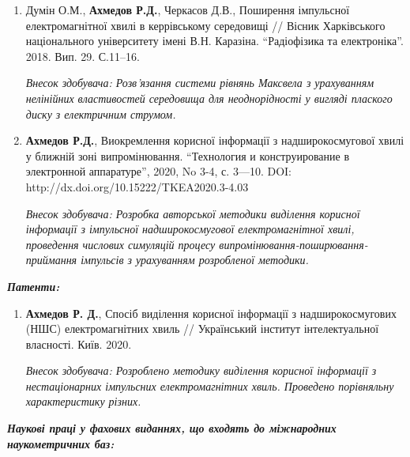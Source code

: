 {\begin{enumerate}
		\item Думін О.М., \textbf{Ахмедов Р.Д.}, Черкасов Д.В., Поширення імпульсної 
		електромагнітної хвилі в керрівському середовищі // Вісник Харківського 
		національного університету імені В.Н. Каразіна. ``Радіофізика та 
		електроніка''. 2018. Вип. 29. С.11--16.
		
		\textit{Внесок здобувача: Розв'язання системи рівнянь Максвела з урахуванням
			нелінійних властивостей середовища для неоднорідності у вигляді плаского 
			диску з електричним струмом.}
		
		\item \textbf{Ахмедов Р.Д.}, Виокремлення корисної інформації з 
		надширокосмугової хвилі у ближній зоні випромінювання. ``Технология и 
		конструирование в электронной аппаратуре'', 2020, No 3-4, с. 3—10. DOI: 
		http://dx.doi.org/10.15222/TKEA2020.3-4.03
		
		\textit{Внесок здобувача: Розробка авторської методики виділення корисної 
			інформації з імпульсної надширокосмугової електромагнітної хвилі, проведення 
			числових симуляцій процесу випромінювання-поширювання-приймання імпульсів з
			урахуванням розробленої методики.}
		
		\setcounter{ItemsInMyWriting}{\value{enumi}}
	\end{enumerate}
	
	\begin{center}
		\textit{\textbf{Патенти:}}
		
		\begin{enumerate}
			\setcounter{enumi}{\value{ItemsInMyWriting}}
			
			\item \textbf{Ахмедов Р. Д.}, Спосіб виділення корисної інформації з 
			надширокосмугових (НШС) електромагнітних хвиль // Український інститут 
			інтелектуальної власності. Київ. 2020.
			
			\textit{Внесок здобувача: Розроблено методику виділення корисної інформації 
				з нестаціонарних імпульсних електромагнітних хвиль. Проведено порівняльну 
				характеристику різних.}
			
			\setcounter{ItemsInMyWriting}{\value{enumi}}
		\end{enumerate}
		
		\begin{center} 
			\textit{\textbf{Наукові праці у фахових виданнях, що входять до 
					міжнародних наукометричних баз:}}
		\end{center}
		
		\begin{enumerate}
			\setcounter{enumi}{\value{ItemsInMyWriting}}
			

\end{enumerate}
\end{center}}
